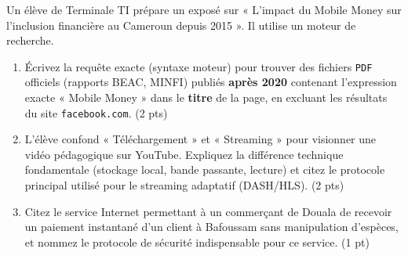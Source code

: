 \documentclass[11pt]{article}
\begin{document}
\begin{exercice}
Un élève de Terminale TI prépare un exposé sur « L'impact du Mobile Money sur l'inclusion financière au Cameroun depuis 2015 ». Il utilise un moteur de recherche.
\begin{enumerate}
    \item Écrivez la requête exacte (syntaxe moteur) pour trouver des fichiers \texttt{PDF} officiels (rapports BEAC, MINFI) publiés \textbf{après 2020} contenant l'expression exacte « Mobile Money » dans le \textbf{titre} de la page, en excluant les résultats du site \texttt{facebook.com}. \hfill (2 pts)
    \item L'élève confond « Téléchargement » et « Streaming » pour visionner une vidéo pédagogique sur YouTube. Expliquez la différence technique fondamentale (stockage local, bande passante, lecture) et citez le protocole principal utilisé pour le streaming adaptatif (DASH/HLS). \hfill (2 pts)
    \item Citez le service Internet permettant à un commerçant de Douala de recevoir un paiement instantané d'un client à Bafoussam sans manipulation d'espèces, et nommez le protocole de sécurité indispensable pour ce service. \hfill (1 pt)
\end{enumerate}
\end{exercice}
\end{document}
